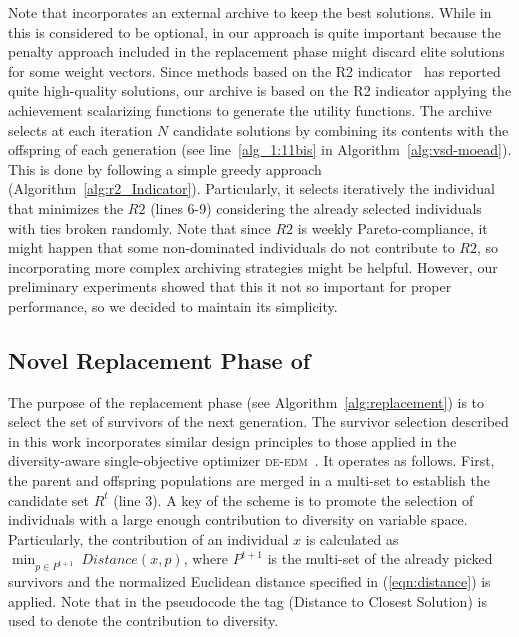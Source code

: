 Note that \AVSDMOEAD{} incorporates an external archive to keep the best solutions.
%
While in \MOEAD{} this is considered to be optional, in our approach is quite important because the penalty approach
included in the replacement phase might discard elite solutions for some weight vectors.
%
Since methods based on the R2 indicator~\cite{trautmann2013r2} has reported quite high-quality solutions, our
archive is based on the R2 indicator applying the achievement scalarizing functions to generate the utility functions.
%
The archive selects at each iteration $N$ candidate solutions by combining its contents with the offspring of each 
generation (see line~\ref{alg_1:11bis} in Algorithm~\ref{alg:vsd-moead}).
%
This is done by following a simple greedy approach (Algorithm~\ref{alg:r2_Indicator}).
%
Particularly, it selects iteratively the individual that minimizes the $R2$ (lines 6-9) considering
the already selected individuals with ties broken randomly.
%
Note that since $R2$ is weekly Pareto-compliance, it might happen that some non-dominated individuals do not contribute
to $R2$, so incorporating more complex archiving strategies might be helpful.
%
However, our preliminary experiments showed that this it not so important for proper performance, so we decided to maintain
its simplicity.

%
\subsection{Novel Replacement Phase of \AVSDMOEAD{} }

The purpose of the replacement phase (see Algorithm~\ref{alg:replacement}) is to select the set of survivors of the next generation.
%
The survivor selection described in this work incorporates similar design principles to those applied in 
the diversity-aware single-objective optimizer \textsc{de-edm}~\cite{castillo2019differential}.
%
It operates as follows.
%
First, the parent and offspring populations are merged in a multi-set to establish the candidate set $R^t$ (line 3).
%
A key of the scheme is to promote the selection of individuals with a large enough contribution to diversity
on variable space.
%
Particularly, the contribution of an individual $x$ is calculated as $\displaystyle{\min_{p \in P^{t+1}}\ Distance(x, p)}$, 
where $P^{t+1}$ is the multi-set of the already picked survivors and the normalized Euclidean distance
specified in (\ref{eqn:distance}) is applied.
%
Note that in the pseudocode the tag \DCS{} (Distance to Closest Solution) is used to denote the contribution to diversity.

